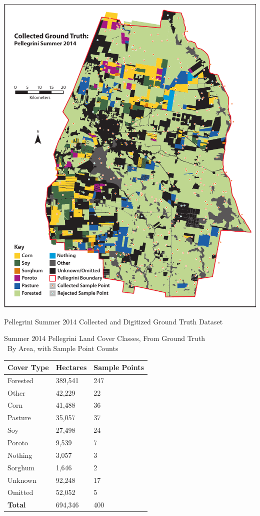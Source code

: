\begin{ssfigure}
  \centering
  \includegraphics[width=\textwidth]{Graphics/collecteddata.pdf}
  \caption{Pellegrini Summer 2014 Collected and Digitized Ground Truth Dataset}
  \label{map:pellegrini:groundtruth}
\end{ssfigure}

\begin{sstable}
  \centering
  \caption[Summer 2014 Pellegrini Land Cover Classes, From Ground Truth]{Summer 2014 Pellegrini Land Cover Classes, From Ground Truth\\~By Area, with Sample Point Counts}
  \label{table:pellegrini:LCarea}
  \begin{tabu}{XX[r]X[r]}
    \toprule
    \textbf{Cover Type} & \textbf{Hectares} & \textbf{Sample Points} \\
    \midrule
    Forested & 389,541 & 247 \\
    Other & 42,229 & 22 \\
    Corn & 41,488 & 36 \\
    Pasture & 35,057 & 37 \\
    Soy & 27,498 & 24 \\
    Poroto & 9,539 & 7 \\
    Nothing & 3,057 & 3 \\
    Sorghum & 1,646 & 2 \\
    \midrule
    Unknown & 92,248 & 17 \\
    Omitted & 52,052 & 5 \\
    \midrule
    \textbf{Total} & 694,346 & 400 \\
    \bottomrule
  \end{tabu}
\end{sstable}

